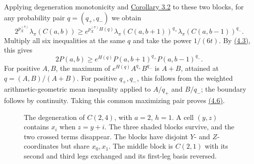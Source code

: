 \begin{amsthmproof}
Applying degeneration monotonicity and \hyperlink{p107.result.3.2}{Corollary 3.2} to these two blocks, for any probability pair $q=(q_+,q_-)$ we obtain
\[
2^{p_X^{(\pi)}}\lambda_\pi(C(a,b))\ge e^{p_X^{(\pi)}H(q)}\lambda_\pi(C(a,b+1))^{q_+}\lambda_\pi(C(a,b-1))^{q_-}.
\]
Multiply all six inequalities at the same $q$ and take the power $1/(6t)$. By \hyperlink{p107.eq.4.3}{(4.3)}, this gives
\[
2P(a,b)\ge e^{H(q)}P(a,b+1)^{q_+}P(a,b-1)^{q_-}.
\]
For positive $A,B$, the maximum of $e^{H(q)}A^{q_+}B^{q_-}$ is $A+B$, attained at $q=(A,B)/(A+B)$. For positive $q_+,q_-$, this follows from the weighted arithmetic-geometric mean inequality applied to $A/q_+$ and $B/q_-$; the boundary follows by continuity. Taking this common maximizing pair proves \hyperlink{p107.eq.4.6}{(4.6)}.
\end{amsthmproof}

\FloatBarrier
\begin{figure}[!ht]
\centering

\caption{The degeneration of $C(2,4)$, with $a=2$, $h=1$. A cell $(y,z)$ contains $x_i$ when $z=y+i$. The three shaded blocks survive, and the two crossed terms disappear. The blocks have disjoint $Y$- and $Z$-coordinates but share $x_0,x_1$. The middle block is $C(2,1)$ with its second and third legs exchanged and its first-leg basis reversed.}
\hypertarget{p107.figure.1}{}\label{fig:107-sectors}
\end{figure}
\FloatBarrier


